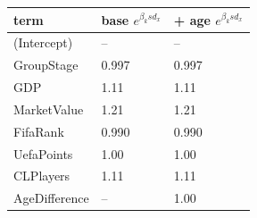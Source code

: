 
\begin{tabular}{lll}
\toprule
term & base $e^{\beta_k sd_x}$ & + age $e^{\beta_k sd_x}$\\
\midrule
(Intercept) & -- & --\\
GroupStage & 0.997 & 0.997\\
GDP & 1.11 & 1.11\\
MarketValue & 1.21 & 1.21\\
FifaRank & 0.990 & 0.990\\
UefaPoints & 1.00 & 1.00\\
CLPlayers & 1.11 & 1.11\\
AgeDifference & -- & 1.00\\
\bottomrule
\end{tabular}
